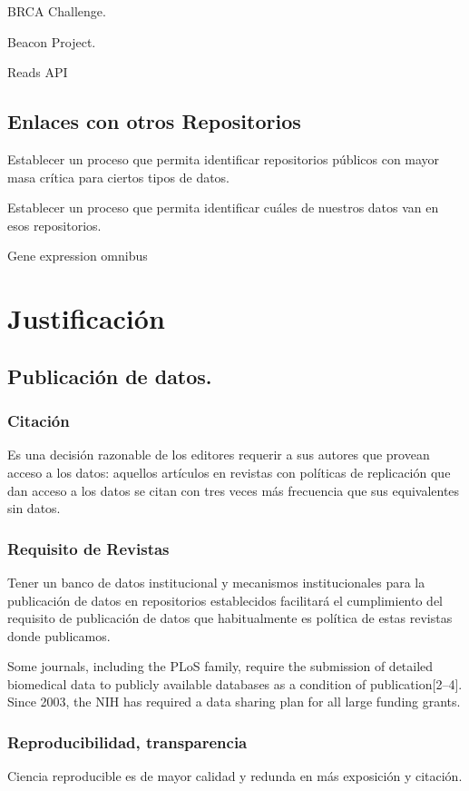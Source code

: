 \documentclass[
10pt, %
letterpaper, %
oneside, %
headinclude,footinclude, %
BCOR5mm, %
]{scrartcl}
\begin{document}
BRCA Challenge.

Beacon Project.

Reads API


\subsection{Enlaces con otros Repositorios}
Establecer un proceso que permita identificar repositorios públicos
con mayor masa crítica para ciertos tipos de datos.

Establecer un proceso que permita identificar cuáles de nuestros datos
van en esos repositorios.
\cite{_genebank_????}
\cite{king_introduction_2007}

Gene expression omnibus

\section{Justificación}

\subsection{Publicación de datos.}


\subsubsection{Citación}
Es una decisión razonable de los editores requerir a sus autores
que provean acceso a los datos: aquellos artículos en revistas con
políticas de replicación que dan acceso a los datos se citan con tres
veces más frecuencia que sus equivalentes sin datos.\cite{walport_sharing_2011}


\subsubsection{Requisito de Revistas}
Tener un banco de datos institucional y mecanismos institucionales
para la publicación de datos en repositorios establecidos facilitará
el cumplimiento del requisito de publicación de datos que
habitualmente es política \cite{hrynaszkiewicz} de estas revistas
donde publicamos.

Some journals, including the
PLoS
family, require the submission of detailed biomedical data to
publicly available databases as a condition of publication[2–4].
Since 2003, the NIH has required a data sharing plan for all large
funding grants. 
\cite{piwowar_sharing_2007}


\subsubsection{Reproducibilidad, transparencia}
Ciencia reproducible es de mayor calidad y redunda en más exposición y
citación. \cite{piwowar_sharing_2007} \cite{ioannidis}
\end{document}
